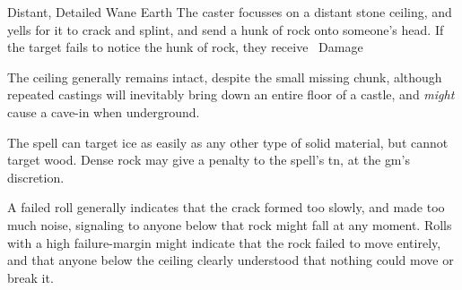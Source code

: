   {Distant, Detailed}%
  {Wane}%
  {Earth}%
  {}%
  {The caster focusses on a distant stone ceiling, and yells for it to crack and splint, and send a hunk of rock onto someone's head.
    If the target fails to notice the hunk of rock, they receive \showDam\ Damage}%
  {
    The ceiling generally remains intact, despite the small missing chunk, although repeated castings will inevitably bring down an entire floor of a castle, and \emph{might} cause a cave-in when underground.

    The spell can target ice as easily as any other type of solid material, but cannot target wood.
    Dense rock may give a penalty to the spell's \gls{tn}, at the \gls{gm}'s discretion.

    A failed roll generally indicates that the crack formed too slowly, and made too much noise, signaling to anyone below that rock might fall at any moment.
    Rolls with a high failure-margin might indicate that the rock failed to move entirely, and that anyone below the ceiling clearly understood that nothing could move or break it.
  }

